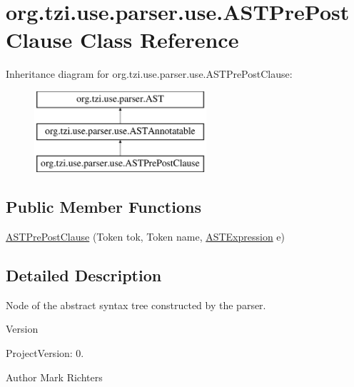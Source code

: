 \hypertarget{classorg_1_1tzi_1_1use_1_1parser_1_1use_1_1_a_s_t_pre_post_clause}{\section{org.\-tzi.\-use.\-parser.\-use.\-A\-S\-T\-Pre\-Post\-Clause Class Reference}
\label{classorg_1_1tzi_1_1use_1_1parser_1_1use_1_1_a_s_t_pre_post_clause}
}
Inheritance diagram for org.\-tzi.\-use.\-parser.\-use.\-A\-S\-T\-Pre\-Post\-Clause\-:\begin{figure}[H]
\begin{center}
\leavevmode
\includegraphics[height=3.000000cm]{classorg_1_1tzi_1_1use_1_1parser_1_1use_1_1_a_s_t_pre_post_clause}
\end{center}
\end{figure}
\subsection*{Public Member Functions}
\begin{DoxyCompactItemize}
\item 
\hyperlink{classorg_1_1tzi_1_1use_1_1parser_1_1use_1_1_a_s_t_pre_post_clause_a35f6c53eb456ee89e28be17a3fc9fa00}{A\-S\-T\-Pre\-Post\-Clause} (Token tok, Token name, \hyperlink{classorg_1_1tzi_1_1use_1_1parser_1_1ocl_1_1_a_s_t_expression}{A\-S\-T\-Expression} e)
\end{DoxyCompactItemize}


\subsection{Detailed Description}
Node of the abstract syntax tree constructed by the parser.

\begin{DoxyVersion}{Version}

\end{DoxyVersion}
\begin{DoxyParagraph}{Project\-Version\-:}
0. 
\end{DoxyParagraph}
\begin{DoxyAuthor}{Author}
Mark Richters 
\end{DoxyAuthor}


